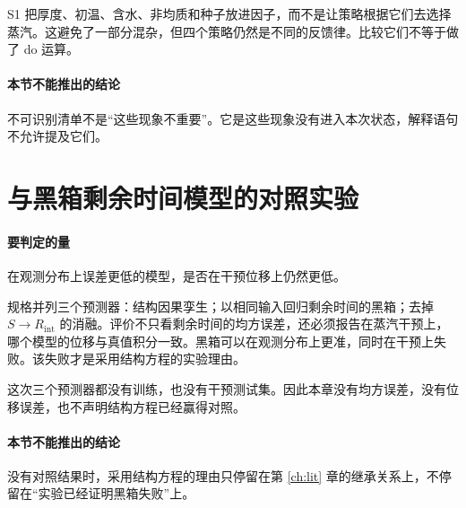 S1 把厚度、初温、含水、非均质和种子放进因子，而不是让策略根据它们去选择蒸汽。这避免了一部分混杂，但四个策略仍然是不同的反馈律。比较它们不等于做了 do 运算。

\paragraph{本节不能推出的结论}
不可识别清单不是“这些现象不重要”。它是这些现象没有进入本次状态，解释语句不允许提及它们。

\section{与黑箱剩余时间模型的对照实验}

\paragraph{要判定的量}
在观测分布上误差更低的模型，是否在干预位移上仍然更低。

规格并列三个预测器：结构因果孪生；以相同输入回归剩余时间的黑箱；去掉 \(S\to R_{\mathrm{int}}\) 的消融。评价不只看剩余时间的均方误差，还必须报告在蒸汽干预上，哪个模型的位移与真值积分一致。黑箱可以在观测分布上更准，同时在干预上失败。该失败才是采用结构方程的实验理由。

这次三个预测器都没有训练，也没有干预测试集。因此本章没有均方误差，没有位移误差，也不声明结构方程已经赢得对照。

\paragraph{本节不能推出的结论}
没有对照结果时，采用结构方程的理由只停留在第 \ref{ch:lit} 章的继承关系上，不停留在“实验已经证明黑箱失败”上。

